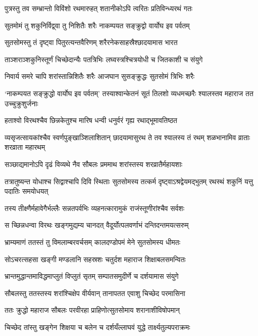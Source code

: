 \twolineshloka
{पुत्रस्तु तव सम्भ्रान्तो विविंशो रथमारुहत्}
{शतानीकोऽपि त्वरितः प्रतिविन्ध्यरथं गतः}


\twolineshloka
{सुतमोमं तु शकुनिर्विद्व्वा तु निशितैः शरैः}
{नाकम्पयत सङ्क्रुद्वो वार्योघ इव पर्वतम्}


\twolineshloka
{सुतसोमस्तु तं दृष्ट्वा पितुरत्यन्तवैरिणम्}
{शरैरनेकसाहस्रैश्छादयामास भारत}


\twolineshloka
{ताञ्शराञ्शकुनिस्तूर्णं चिच्छेदान्यैः पतत्रिभिः}
{लघ्वस्त्रश्चित्रयोधी च जितकाशी च संयुगे}


\twolineshloka
{निवार्य समरे चापि शरांस्तान्निशितैः शरैः}
{आजघान सुसङ्क्रुद्धः सुतसोमं त्रिभिः शरैः}


\threelineshloka
{`नाकम्पयत सङ्क्रुद्धो वार्योघ इव पर्वतम्'}
{तस्याश्वान्केतनं सूतं तिलशो व्यधमच्छरैः}
{श्यालस्तव महाराज तत उच्चुक्रुशुर्जनाः}


\twolineshloka
{हताश्वो विरथश्चैव छिन्नकेतुश्च मारिष}
{धन्वी धनुर्वरं गृह्य रथाद्भूमावतिष्ठत}


\threelineshloka
{व्यसृजत्सायकांश्चैव स्वर्णपुङ्खाञ्शिलाशितान्}
{छादयामासुरथ ते तव श्यालस्य तं रथम्}
{शळभानामिव व्राताः शरव्राता महारथम्}


\twolineshloka
{सञ्छाद्यमानोऽपि दृढं विव्यथे नैव सौबलः}
{प्रममाथ शरांस्तस्य शरव्रातैर्महायशाः}


\threelineshloka
{तत्रातुष्यन्त योधाश्च सिद्वाश्चापि दिवि स्थिताः}
{सुतसोमस्य तत्कर्म दृष्ट्वाऽश्रद्वेयमद्भुतम्}
{रथस्थं शकुनिं यत्तु पदातिः समयोधयत्}


\twolineshloka
{तस्य तीक्ष्णैर्महावेगैर्भल्लैः सन्नतपर्वभिः}
{व्यहनत्कारामुकं राजंस्तूणीरांश्चैव सर्वशः}


\twolineshloka
{स च्छिन्नधन्वा विरथः खङ्गमुद्यम्य चानदत्}
{वैदूर्योत्पलवर्णाभं दन्तिदन्तमयत्सरुम्}


\twolineshloka
{भ्राम्यमाणं ततस्तं तु विमलाम्बरवर्चसम्}
{कालदण्डोपमं मेने सुतसोमस्य धीमतः}


\twolineshloka
{सोऽचरत्सहसा खङ्गी मण्डलानि सहस्रशः}
{चतुर्दश महाराज शिक्षाबलसमन्वितः}


\twolineshloka
{भ्रान्तमुद्धान्तमाविद्धमाप्लुतं विप्लुतं सृतम्}
{सम्पातसमुदीर्णे च दर्शयामास संयुगे}


\twolineshloka
{सौबलस्तु ततस्तस्य शरांश्चिक्षेप वीर्यवान्}
{तानापतत एवाशु चिच्छेद परमासिना}


\twolineshloka
{ततः क्रुद्धो महाराज सौबलः परवीरहा}
{प्राहिणोत्सुतसोमाय शरानाशीविषोपमान्}


\twolineshloka
{चिच्छेद तांस्तु खङ्गेन शिक्षया च बलेन च}
{दर्शयँल्लाघवं युद्धे तार्क्ष्यतुल्यपराक्रमः}


